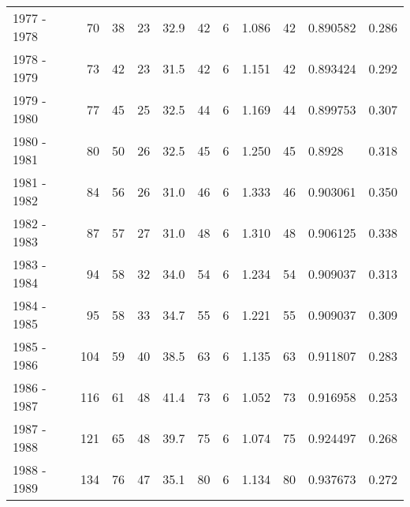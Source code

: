 \begin{tabular}{lrrrrrrrllr}
1977 - 1978 &       70 &       38 &                23 &              32.9 &                      42 &                          6 &       1.086 &            42 &   0.890582 &             0.286 \\
1978 - 1979 &       73 &       42 &                23 &              31.5 &                      42 &                          6 &       1.151 &            42 &   0.893424 &             0.292 \\
1979 - 1980 &       77 &       45 &                25 &              32.5 &                      44 &                          6 &       1.169 &            44 &   0.899753 &             0.307 \\
1980 - 1981 &       80 &       50 &                26 &              32.5 &                      45 &                          6 &       1.250 &            45 &     0.8928 &             0.318 \\
1981 - 1982 &       84 &       56 &                26 &              31.0 &                      46 &                          6 &       1.333 &            46 &   0.903061 &             0.350 \\
1982 - 1983 &       87 &       57 &                27 &              31.0 &                      48 &                          6 &       1.310 &            48 &   0.906125 &             0.338 \\
1983 - 1984 &       94 &       58 &                32 &              34.0 &                      54 &                          6 &       1.234 &            54 &   0.909037 &             0.313 \\
1984 - 1985 &       95 &       58 &                33 &              34.7 &                      55 &                          6 &       1.221 &            55 &   0.909037 &             0.309 \\
1985 - 1986 &      104 &       59 &                40 &              38.5 &                      63 &                          6 &       1.135 &            63 &   0.911807 &             0.283 \\
1986 - 1987 &      116 &       61 &                48 &              41.4 &                      73 &                          6 &       1.052 &            73 &   0.916958 &             0.253 \\
1987 - 1988 &      121 &       65 &                48 &              39.7 &                      75 &                          6 &       1.074 &            75 &   0.924497 &             0.268 \\
1988 - 1989 &      134 &       76 &                47 &              35.1 &                      80 &                          6 &       1.134 &            80 &   0.937673 &             0.272 \\

\end{tabular}
